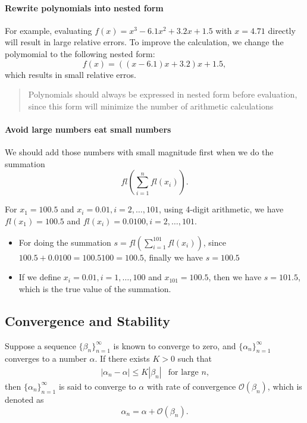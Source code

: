 \paragraph{Rewrite polynomials into nested form}
For example, evaluating $f(x)=x^3-6.1x^2+3.2x+1.5$ with $x=4.71$ directly will result in large relative errors. To improve the calculation, we change the polymomial to the following nested form:
\[
f(x)=((x-6.1)x+3.2)x+1.5,
\]
which results in small relative erros.
\begin{quotation}
Polynomials should always be expressed in nested form before evaluation, since this form will minimize the number of arithmetic calculations
\end{quotation}

\paragraph{Avoid large numbers eat small numbers}
We should add those numbers with small magnitude first when we do the summation
\[
fl\left(\sum_{i=1}^nfl(x_i)\right).
\]
\begin{example}
For $x_1=100.5$ and $x_i=0.01, i=2,\dots,101$, using 4-digit arithmetic, we have $fl(x_1)=100.5$ and $fl(x_i)=0.0100, i=2,\dots,101$.
\begin{itemize}
\item
For doing the summation $s=fl\left(\sum_{i=1}^{101}fl(x_i)\right)$, since $100.5+0.0100=100.5100=100.5$, finally we have $s=100.5$
\item
If we define $x_i=0.01, i=1,\dots,100$ and $x_{101}=100.5$, then we have $s=101.5$, which is the true value of the summation.
\end{itemize}
\end{example}





\subsection{Convergence and Stability}
\begin{definition}[Convergence]
Suppose a sequence $\{\beta_n\}_{n=1}^\infty$ is known to converge to zero, and $\{\alpha_n\}_{n=1}^\infty$ converges to a number $\alpha$. If there exists $K>0$ such that
\[
\begin{array}{ll}
|\alpha_n - \alpha|\le K|\beta_n|
&
\mbox{for large $n$,}
\end{array}
\]
then $\{\alpha_n\}_{n=1}^\infty$ is said to converge to $\alpha$ with rate of convergence $\mathcal{O}(\beta_n)$, which is denoted as
\[
\alpha_n = \alpha + \mathcal{O}(\beta_n).
\]
\end{definition}











